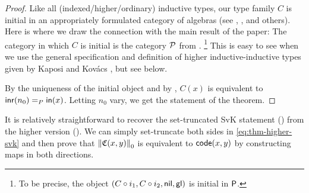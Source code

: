 \begin{proof}
Like all (indexed/higher/ordinary) inductive types,
our type family $C$ is initial in an
appropriately formulated category of algebras (see \citet{awodeyGamSoja_hoAlgs},
\cite{Coquand:2018:HIT:3209108.3209197}, and others).
Here is where we draw the connection with the main result of the paper:
The category in which $C$ is initial is
the category $\CatP$ from .%
\footnote{To be precise, the object $(C \circ i_1, C \circ i_2, \nil, \glconstr)$ is initial in $\PP$.}
This is easy to see when we use the general specification and definition of
higher inductive-inductive types given by Kaposi and Kov{\'a}cs
\cite{kaposi_et_al:LIPIcs:2018:9190,AAhiits},
but see  below.

By the uniqueness of the initial object and by ,
$C(x)$ is equivalent to $\inr(n_0) =_P \inp(x)$.
Letting $n_0$ vary, we get the statement of the theorem.
\end{proof}

It is relatively straightforward to recover the set-truncated SvK statement
() from the higher version ().
We can simply set-truncate both sides in \eqref{eq:thm-higher-svk} and then prove
that $\trunc 0 {\mathfrak C(x,y)}$ is equivalent to $\code(x,y)$ by constructing
maps in both directions.

